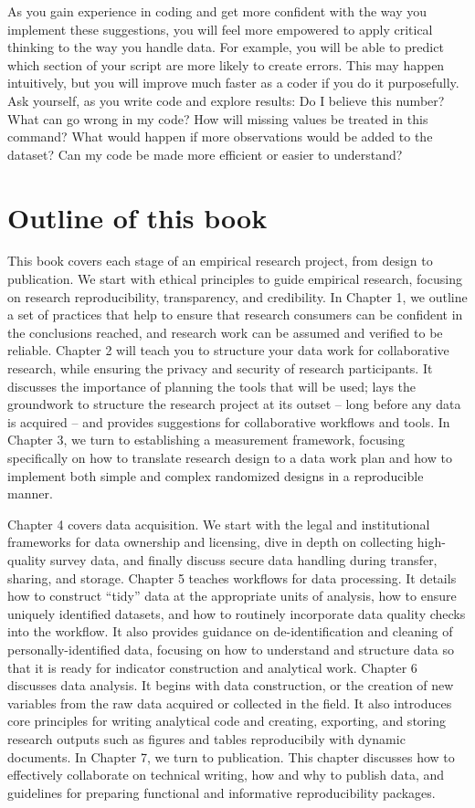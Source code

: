 As you gain experience in coding
and get more confident with the way you implement these suggestions,
you will feel more empowered to apply critical thinking to the way you handle data.
For example, you will be able to predict which section
of your script are more likely to create errors.
This may happen intuitively, but you will improve much faster as a coder
if you do it purposefully.
Ask yourself, as you write code and explore results:
Do I believe this number?
What can go wrong in my code?
How will missing values be treated in this command?
What would happen if more observations would be added to the dataset?
Can my code be made more efficient or easier to understand?



\section{Outline of this book}

This book covers each stage of an empirical research project, from design to publication.
We start with ethical principles to guide empirical research,
focusing on research reproducibility, transparency, and credibility.
In Chapter 1, we outline a set of practices that help to ensure that
research consumers can be confident in the conclusions reached,
and research work can be assumed and verified to be reliable.
Chapter 2 will teach you to structure your data work for collaborative research,
while ensuring the privacy and security of research participants.
It discusses the importance of planning the tools that will be used;
lays the groundwork to structure the research project at its outset --
long before any data is acquired --
and provides suggestions for collaborative workflows and tools.
In Chapter 3, we turn to establishing a measurement framework,
focusing specifically on how to translate research design to a data work plan
and how to implement both simple and complex randomized designs in a reproducible manner.

Chapter 4 covers data acquisition. We start with
the legal and institutional frameworks for data ownership and licensing,
dive in depth on collecting high-quality survey data,
and finally discuss secure data handling during transfer, sharing, and storage.
Chapter 5 teaches workflows for data processing.
It details how to construct ``tidy'' data at the appropriate units of analysis,
how to ensure uniquely identified datasets, and
how to routinely incorporate data quality checks into the workflow.
It also provides guidance on de-identification and cleaning of personally-identified data,
focusing on how to understand and structure data
so that it is ready for indicator construction and analytical work.
Chapter 6 discusses data analysis.
It begins with data construction, or the creation of new variables
from the raw data acquired or collected in the field.
It also introduces core principles for writing analytical code
and creating, exporting, and storing research outputs such as figures and tables reproducibily with dynamic documents.
In Chapter 7, we turn to publication.
This chapter discusses
how to effectively collaborate on technical writing,
how and why to publish data,
and guidelines for preparing functional and informative reproducibility packages.


